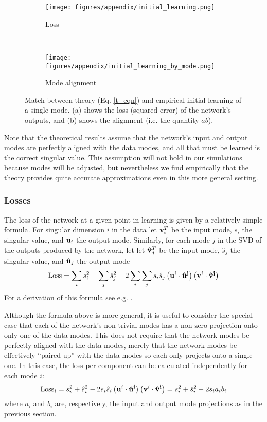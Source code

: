 \documentclass{article}
\newcommand{\bh}[1]{{\bf\hat{#1}}}
\begin{document}
\begin{figure}
\centering
\begin{subfigure}[b]{0.49\textwidth}
\texttt{[image: figures/appendix/initial\_learning.png]}
\caption{Loss} 
\end{subfigure}~%
\begin{subfigure}[b]{0.49\textwidth}
\texttt{[image: figures/appendix/initial\_learning\_by\_mode.png]}
\caption{Mode alignment} 
\end{subfigure}
\caption{Match between theory (Eq. \ref{t_eqn}) and empirical initial learning of a single mode. (a) shows the loss (squared error) of the network's outputs, and (b) shows the alignment (i.e. the quantity $ab$).}
\label{init_fig}
\end{figure}
Note that the theoretical results assume that the network's input and output modes are perfectly aligned with the data modes, and all that must be learned is the correct singular value. This assumption will not hold in our simulations because modes will be adjusted, but nevertheless we find empirically that the theory provides quite accurate approximations even in this more general setting.
\subsubsection{Losses}
The loss of the network at a given point in learning is given by a relatively simple formula. For singular dimension $i$ in the data let ${\bf v}_i^T$ be the input mode, $s_i$ the singular value, and ${\bf u}_i$ the output mode. Similarly, for each mode $j$ in the SVD of the outputs produced by the network, let let $\bh{v}_j^T$ be the input mode, $\hat{s}_j$ the singular value, and $\bh{u}_j$ the output mode
$$\text{Loss} = \sum_{i} s_{i}^2 +  \sum_{j} \hat{s}_{j}^2 - 2 \sum_{i}\sum_{j}  s_{i} \hat{s}_{j} \left({\bf u}^{i} \cdot \bf{\hat u}^{j} \right) \left({\bf v}^{i} \cdot \bf{\hat v}^{j} \right)$$
For a derivation of this formula see e.g. \citet{Lampinen2018}. \par %
Although the formula above is more general, it is useful to consider the special case that each of the network's non-trivial modes has a non-zero projection onto only one of the data modes. This does not require that the network modes be perfectly aligned with the data modes, merely that the network modes be effectively ``paired up'' with the data modes so each only projects onto a single one. In this case, the loss per component can be calculated independently for each mode $i$:
$$\text{Loss}_i = s_i^2 +  \hat{s}_{i}^2 - 2 s_{i} \hat{s}_{i} \left({\bf u}^{i} \cdot \bf{\hat u}^{i} \right) \left({\bf v}^{i} \cdot \bf{\hat v}^{i} \right) = s_i^2 +  \hat{s}_{i}^2 - 2 s_{i} a_i b_i$$
where $a_i$ and $b_i$ are, respectively, the input and output mode projections as in the previous section.
\end{document}
